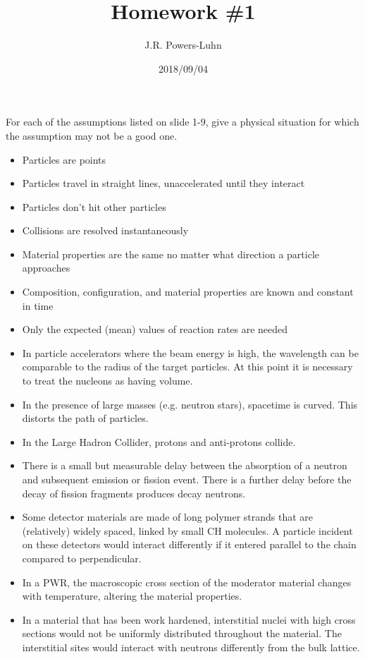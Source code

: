 \documentclass{hw}
\author{J.R. Powers-Luhn}
\date{2018/09/04}
\title{Homework \#1}
\begin{document}
\maketitle

\problem{}
    For each of the assumptions listed on slide 1-9, give a physical situation for which the assumption may not be a good one.
    \begin{itemize}
        \item Particles are points
        \item Particles travel in straight lines, unaccelerated until they interact
        \item Particles don't hit other particles
        \item Collisions are resolved instantaneously
        \item Material properties are the same no matter what direction a particle approaches
        \item Composition, configuration, and material properties are known and constant in time
        \item Only the expected (mean) values of reaction rates are needed
    \end{itemize}

\solution
    \begin{itemize}
        \item In particle accelerators where the beam energy is high, the wavelength can be comparable to the radius of the target particles. At this point it is necessary to treat the nucleons as having volume.
        \item In the presence of large masses (e.g. neutron stars), spacetime is curved. This distorts the path of particles.
        \item In the Large Hadron Collider, protons and anti-protons collide.
        \item There is a small but measurable delay between the absorption of a neutron and subsequent emission or fission event. There is a further delay before the decay of fission fragments produces decay neutrons.
        \item Some detector materials are made of long polymer strands that are (relatively) widely spaced, linked by small CH molecules. A particle incident on these detectors would interact differently if it entered parallel to the chain compared to perpendicular.
        \item In a PWR, the macroscopic cross section of the moderator material changes with temperature, altering the material properties.
        \item In a material that has been work hardened, interstitial nuclei with high cross sections would not be uniformly distributed throughout the material. The interstitial sites would interact with neutrons differently from the bulk lattice.
    \end{itemize}
\end{document}

